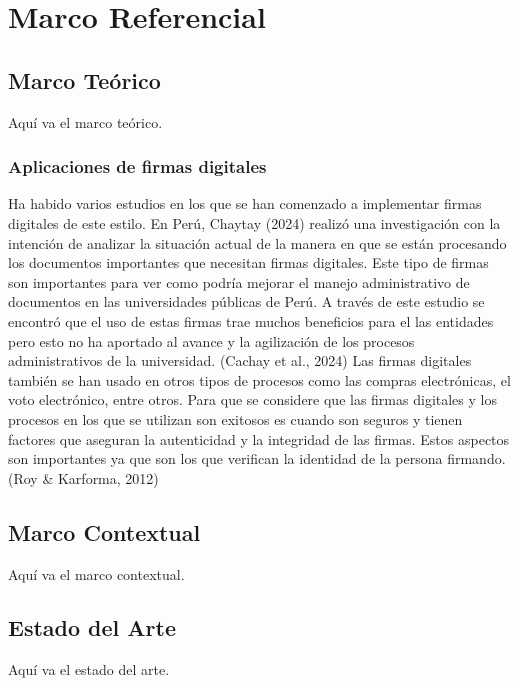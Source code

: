 \documentclass[a4paper,12pt]{report}
\begin{document}
\chapter{Marco Referencial}
\section{Marco Teórico}
Aquí va el marco teórico.
\subsection{Aplicaciones de firmas digitales}

Ha habido varios estudios en los que se han comenzado a implementar firmas digitales de este estilo. En Perú, Chaytay (2024) realizó una investigación con la intención de analizar la situación actual de la manera en que se están procesando los documentos importantes que necesitan firmas digitales. Este tipo de firmas son importantes para ver como podría mejorar el manejo administrativo de documentos en las universidades públicas de Perú. A través de este estudio se encontró que el uso de estas firmas trae muchos beneficios para el las entidades pero esto no ha aportado al avance y la agilización de los procesos administrativos de la universidad. (Cachay et al., 2024) Las firmas digitales también se han usado en otros tipos de procesos como las compras electrónicas, el voto electrónico, entre otros. Para que se considere que las firmas digitales y los procesos en los que se utilizan son exitosos es cuando son seguros y tienen factores que aseguran la autenticidad y la integridad de las firmas. Estos aspectos son importantes ya que son los que verifican la identidad de la persona firmando. (Roy & Karforma, 2012)
\section{Marco Contextual}
Aquí va el marco contextual.

\section{Estado del Arte}
Aquí va el estado del arte.

\end{document}
